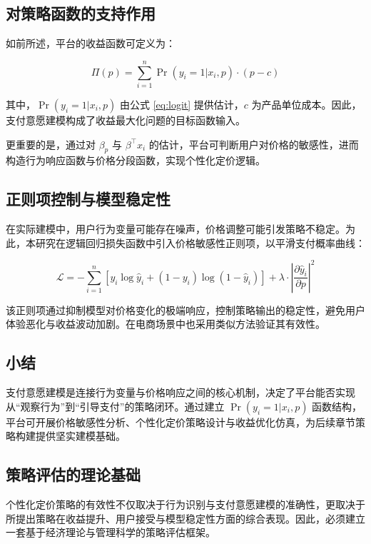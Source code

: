 \subsection{对策略函数的支持作用}

如前所述，平台的收益函数可定义为：

\begin{equation}
\Pi(p) = \sum_{i=1}^{n} \Pr(y_i = 1 | x_i, p) \cdot (p - c)
\end{equation}

其中，$\Pr(y_i = 1 | x_i, p)$ 由公式 \eqref{eq:logit} 提供估计，$c$ 为产品单位成本。因此，支付意愿建模构成了收益最大化问题的目标函数输入。

更重要的是，通过对 $\beta_p$ 与 $\beta^\top x_i$ 的估计，平台可判断用户对价格的敏感性，进而构造行为响应函数与价格分段函数，实现个性化定价逻辑。

\subsection{正则项控制与模型稳定性}

在实际建模中，用户行为变量可能存在噪声，价格调整可能引发策略不稳定。为此，本研究在逻辑回归损失函数中引入价格敏感性正则项，以平滑支付概率曲线：

\begin{equation}
\mathcal{L} = -\sum_{i=1}^{n} \left[ y_i \log \hat{y}_i + (1 - y_i)\log(1 - \hat{y}_i) \right] + \lambda \cdot \left| \frac{\partial \hat{y}_i}{\partial p} \right|^2
\end{equation}

该正则项通过抑制模型对价格变化的极端响应，控制策略输出的稳定性，避免用户体验恶化与收益波动加剧。在电商场景中也采用类似方法验证其有效性。


\subsection*{小结}

支付意愿建模是连接行为变量与价格响应之间的核心机制，决定了平台能否实现从“观察行为”到“引导支付”的策略闭环。通过建立 $\Pr(y_i=1|x_i,p)$ 函数结构，平台可开展价格敏感性分析、个性化定价策略设计与收益优化仿真，为后续章节策略构建提供坚实建模基础。

\subsection{策略评估的理论基础}
\label{sec:策略评估理论}

个性化定价策略的有效性不仅取决于行为识别与支付意愿建模的准确性，更取决于所提出策略在收益提升、用户接受与模型稳定性方面的综合表现。因此，必须建立一套基于经济理论与管理科学的策略评估框架。

